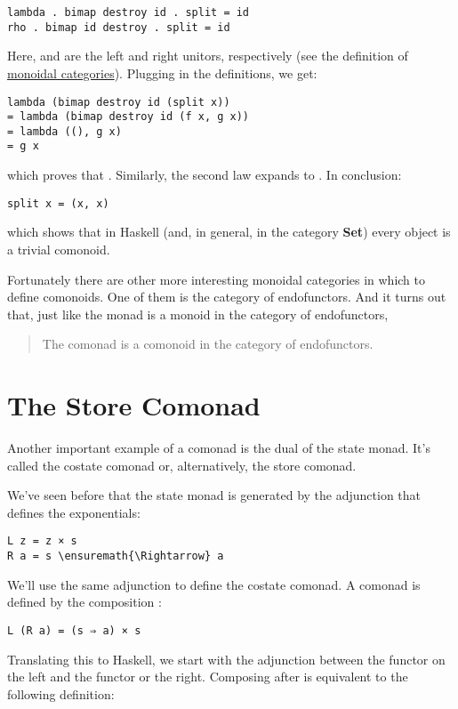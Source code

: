 \begin{verbatim}
lambda . bimap destroy id . split = id
rho . bimap id destroy . split = id
\end{verbatim}
Here,  and  are the left and right unitors,
respectively (see the definition of
\hyperref[monads-categorically]{monoidal
categories}). Plugging in the definitions, we get:

\begin{verbatim}
lambda (bimap destroy id (split x))
= lambda (bimap destroy id (f x, g x))
= lambda ((), g x)
= g x
\end{verbatim}
which proves that . Similarly, the second law expands
to . In conclusion:

\begin{verbatim}
split x = (x, x)
\end{verbatim}
which shows that in Haskell (and, in general, in the category
\textbf{Set}) every object is a trivial comonoid.

Fortunately there are other more interesting monoidal categories in
which to define comonoids. One of them is the category of endofunctors.
And it turns out that, just like the monad is a monoid in the category
of endofunctors,

\begin{quote}
The comonad is a comonoid in the category of endofunctors.
\end{quote}

\section{The Store Comonad}\label{the-store-comonad}

Another important example of a comonad is the dual of the state monad.
It's called the costate comonad or, alternatively, the store comonad.

We've seen before that the state monad is generated by the adjunction
that defines the exponentials:

\begin{Verbatim}[commandchars=\\\{\}]
L z = z × s
R a = s \ensuremath{\Rightarrow} a
\end{Verbatim}
We'll use the same adjunction to define the costate comonad. A comonad
is defined by the composition :

\begin{verbatim}
L (R a) = (s ⇒ a) × s
\end{verbatim}
Translating this to Haskell, we start with the adjunction between the
 functor on the left and the  functor or the
right. Composing  after  is equivalent to
the following definition:

